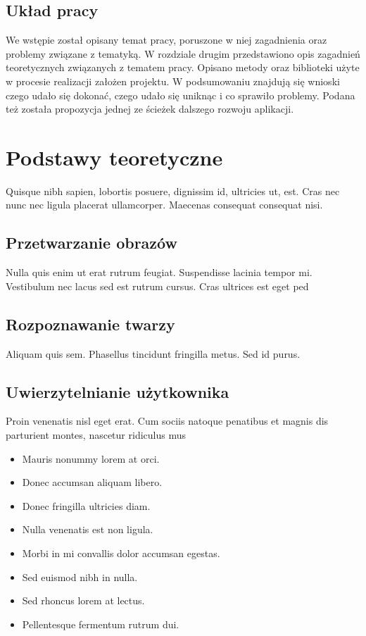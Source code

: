 \documentclass[eng,printmode]{mgr}
\begin{document}
\section{Układ pracy}
We wstępie został opisany temat pracy, poruszone w niej zagadnienia oraz problemy związane z tematyką. W rozdziale drugim przedstawiono opis zagadnień teoretycznych związanych z tematem pracy. Opisano metody oraz biblioteki użyte w procesie realizacji założen projektu. W podsumowaniu znajdują się wnioski czego udało się dokonać, czego udało się uniknąc i co sprawiło problemy. Podana też została propozycja jednej ze ścieżek dalszego rozwoju aplikacji.
\chapter{Podstawy teoretyczne}
Quisque nibh sapien, lobortis posuere, dignissim id, ultricies ut, est. Cras nec nunc nec ligula placerat ullamcorper. Maecenas consequat consequat nisi.


\section{Przetwarzanie obrazów}
Nulla quis enim ut erat rutrum feugiat. Suspendisse lacinia tempor mi. Vestibulum nec lacus sed est rutrum cursus. Cras ultrices est eget ped
\section{Rozpoznawanie twarzy}
Aliquam quis sem. Phasellus tincidunt fringilla metus. Sed id purus.

\section{Uwierzytelnianie użytkownika}
Proin venenatis nisl eget erat. Cum sociis natoque penatibus et magnis dis parturient montes, nascetur ridiculus mus
\begin{itemize}
\item Mauris nonummy lorem at orci.
\item Donec accumsan aliquam libero.
\item Donec fringilla ultricies diam.
\item Nulla venenatis est non ligula.
\item Morbi in mi convallis dolor accumsan egestas.
\item Sed euismod nibh in nulla.
\item Sed rhoncus lorem at lectus.
\item Pellentesque fermentum rutrum dui.
\end{itemize}
\end{document}
